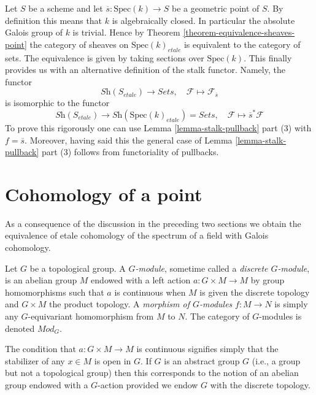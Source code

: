 \begin{remark}
\label{remark-stalk-pullback}
Let $S$ be a scheme and let $\overline{s} : \text{Spec}(k) \to S$
be a geometric point of $S$. By definition this means that $k$
is algebraically closed. In particular the absolute Galois group of $k$
is trivial. Hence by
Theorem \ref{theorem-equivalence-sheaves-point}
the category of sheaves on $\text{Spec}(k)_{etale}$ is equivalent
to the category of sets. The equivalence is given by taking
sections over $\text{Spec}(k)$. This finally provides us with an
alternative definition of the stalk functor. Namely, the functor
$$
\textit{Sh}(S_{etale}) \longrightarrow \textit{Sets},\quad
\mathcal{F} \longmapsto \mathcal{F}_{\overline{s}}
$$
is isomorphic to the functor
$$
\textit{Sh}(S_{etale})
\longrightarrow
\textit{Sh}(\text{Spec}(k)_{etale}) = \textit{Sets},
\quad
\mathcal{F} \longmapsto \overline{s}^*\mathcal{F}
$$
To prove this rigorously one can use
Lemma \ref{lemma-stalk-pullback} part (3)
with $f = \overline{s}$. Moreover, having said this the general case of
Lemma \ref{lemma-stalk-pullback} part (3)
follows from functoriality of pullbacks.
\end{remark}




\section{Cohomology of a point}
\label{section-cohomology-point}

\noindent
As a consequence of the discussion in the preceding two sections
we obtain the equivalence of etale cohomology of the spectrum of a
field with Galois cohomology. 

\begin{definition}
\label{definition-G-module-continuous}
Let $G$ be a topological group.
A {\it $G$-module}, sometime called a {\it discrete $G$-module},
is an abelian group $M$ endowed with a left action $a : G \times M \to M$
by group homomorphisms such that $a$ is continuous when $M$ is given the
discrete topology and $G \times M$ the product topology.
A {\it morphism of $G$-modules} $f : M \to N$ is simply any $G$-equivariant
homomorphism from $M$ to $N$.
The category of $G$-modules is denoted {\it $\textit{Mod}_G$}.
\end{definition}

\noindent
The condition that $a : G \times M \to M$ is continuous signifies
simply that the stabilizer of any  $x \in M$ is open in $G$.
If $G$ is an abstract group $G$ (i.e., a group but not a topological group)
then this corresponds to the notion of an abelian group endowed with
a $G$-action provided we endow $G$ with the discrete topology.

